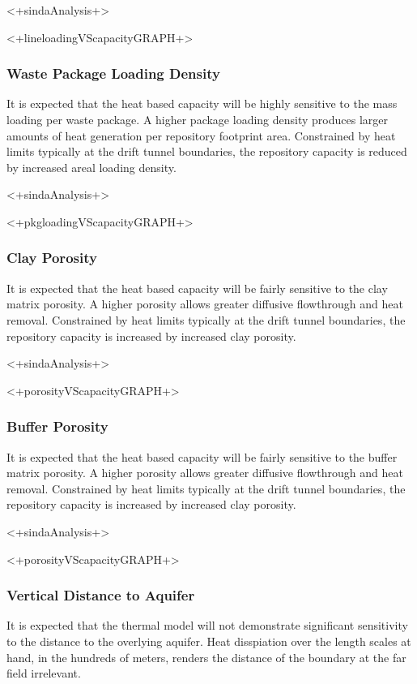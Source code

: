 <+sindaAnalysis+>

<+lineloadingVScapacityGRAPH+>


\subsubsection{Waste Package Loading Density}

It is expected that the heat based capacity will be highly sensitive to the 
mass loading per waste package. A higher package loading density produces larger amounts 
of heat 
generation per repository footprint area. Constrained by heat limits typically 
at the drift tunnel boundaries, the repository capacity is reduced by increased 
areal loading density. 

<+sindaAnalysis+>

<+pkgloadingVScapacityGRAPH+>

\subsubsection{Clay Porosity}

It is expected that the heat based capacity will be fairly sensitive to the 
clay matrix porosity. A higher porosity allows greater diffusive flowthrough and 
heat removal. Constrained by heat limits typically at the drift tunnel
boundaries, the repository capacity is increased by increased clay porosity. 

<+sindaAnalysis+>

<+porosityVScapacityGRAPH+>


\subsubsection{Buffer Porosity}

It is expected that the heat based capacity will be fairly sensitive to the 
buffer matrix porosity. A higher porosity allows greater diffusive flowthrough and 
heat removal. Constrained by heat limits typically at the drift tunnel
boundaries, the repository capacity is increased by increased clay porosity. 

<+sindaAnalysis+>

<+porosityVScapacityGRAPH+>

\subsubsection{Vertical Distance to Aquifer}

It is expected that the thermal model will not demonstrate significant
sensitivity to the distance to the overlying aquifer. Heat disspiation over 
the length scales at hand, in the hundreds of meters, renders the distance of 
the boundary at the far field irrelevant. 



